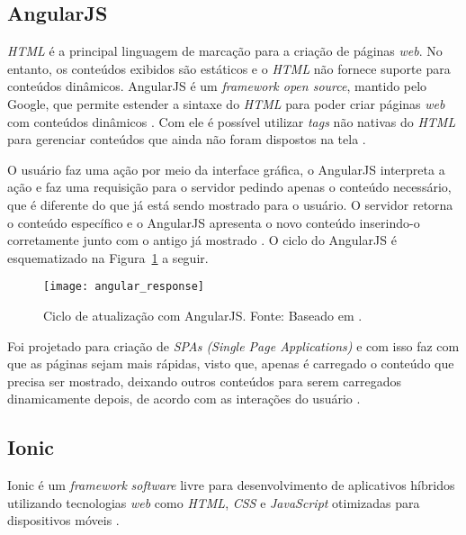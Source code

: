 \subsection{AngularJS} \label{subsection:angularjs}

\textit{HTML} é a principal linguagem de marcação para a criação de páginas \textit{web}. No entanto, os conteúdos 
exibidos são estáticos e o \textit{HTML} não fornece suporte para conteúdos dinâmicos.
AngularJS é um \textit{framework open source}, mantido pelo Google, que permite estender a sintaxe do 
\textit{HTML} para poder criar páginas \textit{web} com conteúdos dinâmicos \cite{bezerra_desenvolvimento_2016}. Com ele é possível utilizar \textit{tags} 
não nativas do \textit{HTML} para gerenciar conteúdos que ainda não 
foram dispostos na tela \cite{google_angularjs_2016}.

O usuário faz uma ação por meio da interface gráfica, 
o AngularJS interpreta a ação e faz uma requisição para o servidor pedindo apenas o conteúdo necessário, que é 
diferente do que já está sendo mostrado para o usuário. 
O servidor retorna o conteúdo específico e o AngularJS apresenta o novo conteúdo inserindo-o corretamente junto 
com o antigo já mostrado \cite{ursino_angularjs:_2015}. O ciclo do AngularJS é esquematizado na Figura~\ref{fig:angular_response} a seguir.

\begin{figure}[h]
  \centering
    \texttt{[image: angular\_response]}
    \caption[Ciclo de atualização com AngularJS]{ Ciclo de atualização com AngularJS. Fonte: Baseado em \cite{ursino_angularjs:_2015}.}
	\label{fig:angular_response}
\end{figure}

Foi projetado para criação de \textit{SPAs (Single Page Applications)} e com isso faz com que as páginas sejam mais rápidas, visto que, apenas é carregado o conteúdo que precisa ser mostrado, 
deixando outros conteúdos para serem carregados dinamicamente depois, de acordo com as interações do usuário \cite{rodriguez_diseno_2015}.

\subsection{Ionic} \label{subsection:ionic}
Ionic é um \textit{framework} \textit{software} livre para desenvolvimento de aplicativos híbridos utilizando tecnologias 
\textit{web} como \textit{HTML}, \textit{CSS} e \textit{JavaScript} otimizadas para dispositivos móveis \cite{drifty_ionic:_2016}. 

